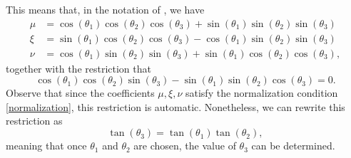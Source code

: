 \documentclass[reqno]{amsart}
\numberwithin{lemma}{section}
\numberwithin{proposition}{section}
\begin{document}

This means that, in the notation of \cite{REZAKHANI2005278}, we have
\begin{align*}
	\mu  &= \cos(\theta_{1}) \cos(\theta_{2}) \cos(\theta_{3}) + \sin(\theta_{1}) \sin(\theta_{2}) \sin(\theta_{3})\\
	\xi &= \sin(\theta_{1}) \cos(\theta_{2}) \cos(\theta_{3}) - \cos(\theta_{1}) \sin(\theta_{2}) \sin(\theta_{3})\\
	\nu &= \cos(\theta_{1}) \sin(\theta_{2}) \sin(\theta_{3}) + \sin(\theta_{1}) \cos(\theta_{2}) \cos(\theta_{3}),
\end{align*}
together with the restriction that
\begin{equation*}
	\cos(\theta_{1}) \cos(\theta_{2}) \sin(\theta_{3}) - \sin(\theta_{1}) \sin(\theta_{2}) \cos(\theta_{3}) = 0.
\end{equation*}
Observe that since the coefficients $\mu, \xi, \nu$ satisfy the normalization condition \eqref{normalization}, this restriction is automatic. Nonetheless, we can rewrite this restriction as
\begin{equation*}
	\tan(\theta_{3}) = \tan(\theta_{1}) \tan(\theta_{2}),
\end{equation*}
meaning that once $\theta_{1}$ and $\theta_{2}$ are chosen, the value of $\theta_{3}$ can be determined.
\end{document}
